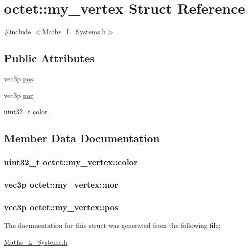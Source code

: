 \hypertarget{structoctet_1_1my__vertex}{\section{octet\+:\+:my\+\_\+vertex Struct Reference}
\label{structoctet_1_1my__vertex}
}


{\ttfamily \#include $<$Maths\+\_\+\+L\+\_\+\+Systems.\+h$>$}

\subsection*{Public Attributes}
\begin{DoxyCompactItemize}
\item 
vec3p \hyperlink{structoctet_1_1my__vertex_abe1d8d1225d7afad95836438752bc6fb}{pos}
\item 
vec3p \hyperlink{structoctet_1_1my__vertex_ad237b5e32fa56bd0735b191cfef944ed}{nor}
\item 
uint32\+\_\+t \hyperlink{structoctet_1_1my__vertex_ac03553dc3cedaa245368ab2849a4cc9a}{color}
\end{DoxyCompactItemize}


\subsection{Member Data Documentation}
\hypertarget{structoctet_1_1my__vertex_ac03553dc3cedaa245368ab2849a4cc9a}{
\subsubsection[{color}]{\setlength{\rightskip}{0pt plus 5cm}uint32\+\_\+t octet\+::my\+\_\+vertex\+::color}}\label{structoctet_1_1my__vertex_ac03553dc3cedaa245368ab2849a4cc9a}
\hypertarget{structoctet_1_1my__vertex_ad237b5e32fa56bd0735b191cfef944ed}{
\subsubsection[{nor}]{\setlength{\rightskip}{0pt plus 5cm}vec3p octet\+::my\+\_\+vertex\+::nor}}\label{structoctet_1_1my__vertex_ad237b5e32fa56bd0735b191cfef944ed}
\hypertarget{structoctet_1_1my__vertex_abe1d8d1225d7afad95836438752bc6fb}{
\subsubsection[{pos}]{\setlength{\rightskip}{0pt plus 5cm}vec3p octet\+::my\+\_\+vertex\+::pos}}\label{structoctet_1_1my__vertex_abe1d8d1225d7afad95836438752bc6fb}


The documentation for this struct was generated from the following file\+:\begin{DoxyCompactItemize}
\item 
\hyperlink{_maths___l___systems_8h}{Maths\+\_\+\+L\+\_\+\+Systems.\+h}\end{DoxyCompactItemize}
